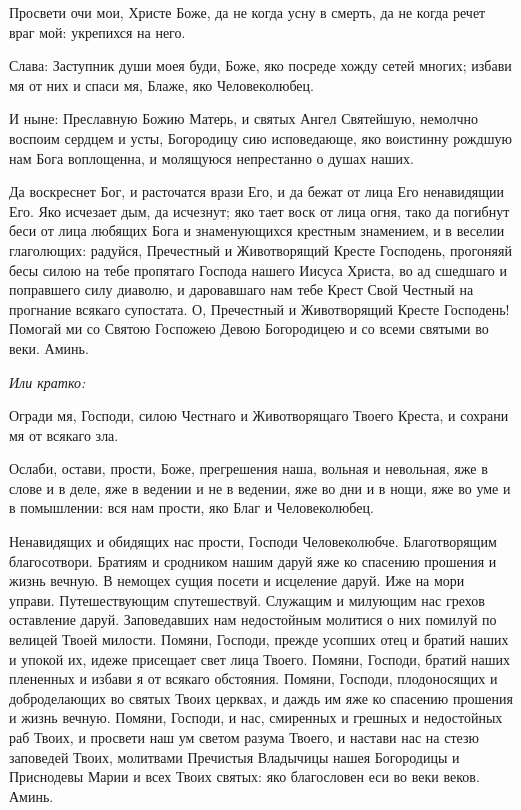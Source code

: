 Просвети очи мои, Христе Боже, да не когда усну в смерть, да не когда речет враг мой: укрепихся на него.


Слава: Заступник души моея буди, Боже, яко посреде хожду сетей многих; избави мя от них и спаси мя, Блаже, яко Человеколюбец. 


И ныне: Преславную Божию Матерь, и святых Ангел Святейшую, немолчно воспоим сердцем и усты, Богородицу сию исповедающе, яко воистинну рождшую нам Бога воплощенна, и молящуюся непрестанно о душах наших.




Да воскреснет Бог, и расточатся врази Его, и да бежат от лица Его ненавидящии Его. Яко исчезает дым, да исчезнут; яко тает воск от лица огня, тако да погибнут беси от лица любящих Бога и знаменующихся крестным знамением, и в веселии глаголющих: радуйся, Пречестный и Животворящий Кресте Господень, прогоняяй бесы силою на тебе пропятаго Господа нашего Иисуса Христа, во ад сшедшаго и поправшего силу диаволю, и даровавшаго нам тебе Крест Свой Честный на прогнание всякаго супостата. О, Пречестный и Животворящий Кресте Господень! Помогай ми со Святою Госпожею Девою Богородицею и со всеми святыми во веки. Аминь.


\medskip\itshape Или кратко:\normalfont{}


Огради мя, Господи, силою Честнаго и Животворящаго Твоего Креста, и сохрани мя от всякаго зла.




Ослаби, остави, прости, Боже, прегрешения наша, вольная и невольная, яже в слове и в деле, яже в ведении и не в ведении, яже во дни и в нощи, яже во уме и в помышлении: вся нам прости, яко Благ и Человеколюбец.




Ненавидящих и обидящих нас прости, Господи Человеколюбче. Благотворящим благосотвори. Братиям и сродником нашим даруй яже ко спасению прошения и жизнь вечную. В немощех сущия посети и исцеление даруй. Иже на мори управи. Путешествующим спутешествуй. Служащим и милующим нас грехов оставление даруй. Заповедавших нам недостойным молитися о них помилуй по велицей Твоей милости. Помяни, Господи, прежде усопших отец и братий наших и упокой их, идеже присещает свет лица Твоего. Помяни, Господи, братий наших плененных и избави я от всякаго обстояния. Помяни, Господи, плодоносящих и доброделающих во святых Твоих церквах, и даждь им яже ко спасению прошения и жизнь вечную. Помяни, Господи, и нас, смиренных и грешных и недостойных раб Твоих, и просвети наш ум светом разума Твоего, и настави нас на стезю заповедей Твоих, молитвами Пречистыя Владычицы нашея Богородицы и Приснодевы Марии и всех Твоих святых: яко благословен еси во веки веков. Аминь.


